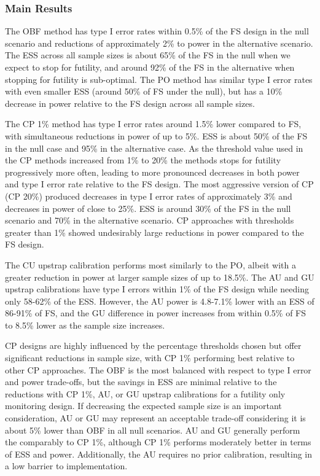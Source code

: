 \documentclass[Afour,sageh,times,square,numbers]{sagej}
\begin{document}
\subsubsection{Main Results}

The OBF method has type I error rates within 0.5\% of the FS design in the null scenario and reductions of approximately 2\% to power in the alternative scenario. The ESS across all sample sizes is about 65\% of the FS in the null when we expect to stop for futility, and around 92\% of the FS in the alternative when stopping for futility is sub-optimal. The PO method has similar type I error rates with even smaller ESS (around 50\% of FS under the null), but has a 10\% decrease in power relative to the FS design across all sample sizes.

The CP 1\% method has type I error rates around 1.5\% lower compared to FS, with simultaneous reductions in power of up to 5\%.  ESS is about 50\% of the FS in the null case and 95\% in the alternative case.  As the threshold value used in the CP methods increased from 1\% to 20\% the methods stops for futility progressively more often, leading to more pronounced decreases in both power and type I error rate relative to the FS design.  The most aggressive version of CP (CP 20\%) produced decreases in type I error rates of approximately 3\% and decreases in power of close to 25\%.  ESS is around 30\% of the FS in the null scenario and 70\% in the alternative scenario.  CP approaches with thresholds greater than 1\% showed undesirably large reductions in power compared to the FS design.

The CU upstrap calibration performs most similarly to the PO, albeit with a greater reduction in power at larger sample sizes of up to 18.5\%. The AU and GU upstrap calibrations have type I errors within 1\% of the FS design while needing only 58-62\% of the ESS. However, the AU power is 4.8-7.1\% lower with an ESS of 86-91\% of FS, and the GU difference in power increases from within 0.5\% of FS to 8.5\% lower as the sample size increases.

CP designs are highly influenced by the percentage thresholds chosen but offer significant reductions in sample size, with CP 1\% performing best relative to other CP approaches.  The OBF is the most balanced with respect to type I error and power trade-offs, but the savings in ESS are minimal relative to the reductions with CP 1\%, AU, or GU upstrap calibrations for a futility only monitoring design. If decreasing the expected sample size is an important consideration, AU or GU may represent an acceptable trade-off considering it is about 5\% lower than OBF in all null scenarios.  AU and GU generally perform the comparably to CP 1\%, although CP 1\% performs moderately better in terms of ESS and power. Additionally, the AU requires no prior calibration, resulting in a low barrier to implementation.
\end{document}
